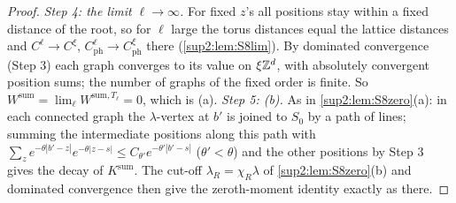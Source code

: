 \begin{proof}
\emph{Step 4: the limit $\ell\to\infty$.} For fixed $z$'s all positions stay within a fixed distance of the root, so for $\ell$ large the torus distances equal the lattice distances and $C^\ell\to C^\xi$, $C^\ell_{\mathrm{ph}}\to C^\xi_{\mathrm{ph}}$ there (\cref{sup2:lem:S8lim}). By dominated convergence (Step 3) each graph converges to its value on $\xi\mathbb Z^d$, with absolutely convergent position sums; the number of graphs of the fixed order is finite. So $W^{\mathrm{sum}}=\lim_\ell W^{\mathrm{sum},T_\ell}=0$, which is (a).
\emph{Step 5: (b).} As in \cref{sup2:lem:S8zero}(a): in each connected graph the $\lambda$-vertex at $b'$ is joined to $S_0$ by a path of lines; summing the intermediate positions along this path with $\sum_ze^{-\theta|b'-z|}e^{-\theta|z-s|}\le C_{\theta'}e^{-\theta'|b'-s|}$ ($\theta'<\theta$) and the other positions by Step 3 gives the decay of $K^{\mathrm{sum}}$. The cut-off $\lambda_R=\chi_R\lambda$ of \cref{sup2:lem:S8zero}(b) and dominated convergence then give the zeroth-moment identity exactly as there.
\end{proof}

